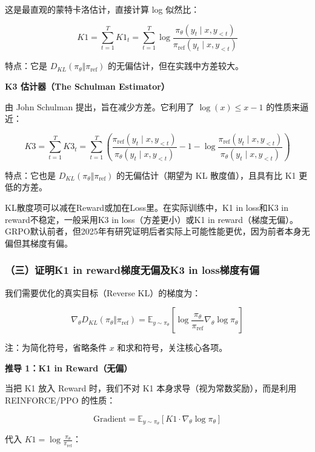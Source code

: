 这是最直观的蒙特卡洛估计，直接计算 log 似然比：

\[
K1=\sum_{t=1}^{T}K1_t
=\sum_{t=1}^{T}\log\frac{\pi_\theta(y_t\mid x,y_{<t})}{\pi_{\mathrm{ref}}(y_t\mid x,y_{<t})}
\]

特点：它是 \(D_{KL}(\pi_\theta \Vert \pi_{\mathrm{ref}})\) 的无偏估计，但在实践中方差较大。

\textbf{K3 估计器（The Schulman Estimator）}

由 John Schulman 提出，旨在减少方差。它利用了 \(\log(x)\le x-1\) 的性质来逼近：

\[
K3=\sum_{t=1}^{T}K3_t
=\sum_{t=1}^{T}\left(
\frac{\pi_{\mathrm{ref}}(y_t\mid x,y_{<t})}{\pi_\theta(y_t\mid x,y_{<t})}
-1
-\log\frac{\pi_{\mathrm{ref}}(y_t\mid x,y_{<t})}{\pi_\theta(y_t\mid x,y_{<t})}
\right)
\]

特点：它也是 \(D_{KL}(\pi_\theta \Vert \pi_{\mathrm{ref}})\) 的无偏估计（期望为 KL 散度值），且具有比 K1 更低的方差。

KL散度项可以减在Reward或加在Loss里。在实际训练中，K1 in loss和K3 in reward不稳定，一般采用K3 in loss（方差更小）或K1 in reward（梯度无偏）。GRPO默认前者，但2025年有研究证明后者实际上可能性能更优，因为前者本身无偏但其梯度有偏。

\hypertarget{ux4e09ux8bc1ux660ek1-in-rewardux68afux5ea6ux65e0ux504fux53cak3-in-lossux68afux5ea6ux6709ux504f}{%
\subsubsection{（三）证明K1 in reward梯度无偏及K3 in loss梯度有偏}\label{ux4e09ux8bc1ux660ek1-in-rewardux68afux5ea6ux65e0ux504fux53cak3-in-lossux68afux5ea6ux6709ux504f}}

我们需要优化的真实目标（Reverse KL）的梯度为：

\[
\nabla_\theta D_{KL}(\pi_\theta \Vert \pi_{\mathrm{ref}})
=\mathbb{E}_{y\sim\pi_\theta}\left[
\log\frac{\pi_\theta}{\pi_{\mathrm{ref}}}\nabla_\theta\log\pi_\theta
\right]
\]

注：为简化符号，省略条件 \(x\) 和求和符号，关注核心各项。

\textbf{推导 1：K1 in Reward（无偏）}

当把 K1 放入 Reward 时，我们不对 K1 本身求导（视为常数奖励），而是利用 REINFORCE/PPO 的性质：

\[
\mathrm{Gradient}
=\mathbb{E}_{y\sim\pi_\theta}\left[K1\cdot\nabla_\theta\log\pi_\theta\right]
\]

代入 \(K1=\log\frac{\pi_\theta}{\pi_{\mathrm{ref}}}\)：

